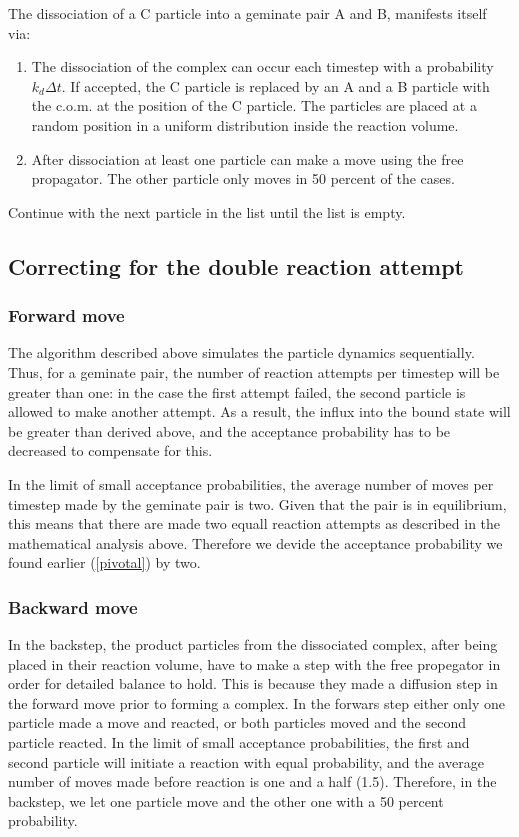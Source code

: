 The dissociation of a C particle into a geminate pair A and B, manifests itself via:

\begin{enumerate}
\item The dissociation of the complex can occur each timestep with a probability $k_d \Delta t$. If accepted, the C particle is replaced by an A and a B particle with the c.o.m. at the position of the C particle. The particles are placed at a random position in a uniform distribution inside the reaction volume.
\item After dissociation at least one particle can make a move using the free propagator. The other particle only moves in 50 percent of the cases. 
\end{enumerate}

Continue with the next particle in the list until the list is empty.

\subsection{Correcting for the double reaction attempt}

\subsubsection{Forward move}

The algorithm described above simulates the particle dynamics sequentially. Thus, for a geminate pair, the number of reaction attempts per timestep will be greater than one: in the case the first attempt failed, the second particle is allowed to make another attempt. As a result, the influx into the bound state will be greater than derived above, and the acceptance probability has to be decreased to compensate for this. 

In the limit of small acceptance probabilities, the average number of moves per timestep made by the geminate pair is two. Given that the pair is in equilibrium, this means that there are made two equall reaction attempts as described in the mathematical analysis above. Therefore we devide the acceptance probability we found earlier (\ref{pivotal}) by two.

\subsubsection{Backward move}

In the backstep, the product particles from the dissociated complex, after being placed in their reaction volume, have to make a step with the free propegator in order for detailed balance to hold. This is because they made a diffusion step in the forward move prior to forming a complex. In the forwars step either only one particle made a move and reacted, or both particles moved and the second particle reacted. In the limit of small acceptance probabilities, the first and second particle will initiate a reaction with equal probability, and the average number of moves made before reaction is one and a half (1.5). Therefore, in the backstep, we let one particle move and the other one with a 50 percent probability.

